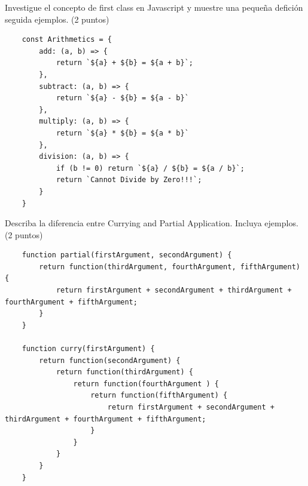 \documentclass[12pt, a4paper]{exam}
\begin{document}
\begin{questions}
	\pointsdroppedatright
	\question Investigue el concepto de first class en Javascript y muestre una pequeña defición seguida ejemplos. (2 puntos)
\vspace{0.2in}

\begin{verbatim}
	const Arithmetics = {
		add: (a, b) => {
			return `${a} + ${b} = ${a + b}`;
		},
		subtract: (a, b) => {
			return `${a} - ${b} = ${a - b}`
		},
		multiply: (a, b) => {
			return `${a} * ${b} = ${a * b}`
		},
		division: (a, b) => {
			if (b != 0) return `${a} / ${b} = ${a / b}`;
			return `Cannot Divide by Zero!!!`;
		}
	}
\end{verbatim}


\pointsdroppedatright
	\question Describa la diferencia entre Currying and Partial Application. Incluya ejemplos. (2 puntos)
\vspace{0.2in}

\begin{verbatim}
	function partial(firstArgument, secondArgument) {
		return function(thirdArgument, fourthArgument, fifthArgument) {
			return firstArgument + secondArgument + thirdArgument + fourthArgument + fifthArgument;
		}
	}

	function curry(firstArgument) {
		return function(secondArgument) {
			return function(thirdArgument) {
				return function(fourthArgument ) {
					return function(fifthArgument) {
						return firstArgument + secondArgument + thirdArgument + fourthArgument + fifthArgument;
					}
				}
			}
		}
	}
\end{verbatim}


\end{questions}
\end{document}
